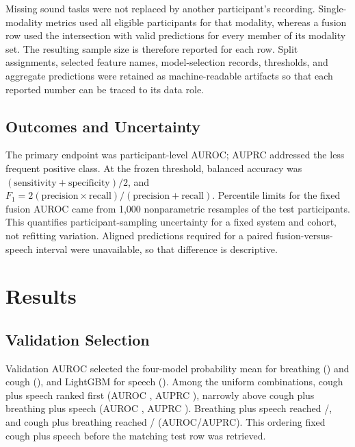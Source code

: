 \documentclass[conference]{IEEEtran}
\begin{document}
Missing sound tasks were not replaced by another participant's recording.
Single-modality metrics used all eligible participants for that modality,
whereas a fusion row used the intersection with valid predictions for every
member of its modality set. The resulting sample size is therefore reported for
each row. Split assignments, selected feature names, model-selection records,
thresholds, and aggregate predictions were retained as machine-readable
artifacts so that each reported number can be traced to its data role.

\subsection{Outcomes and Uncertainty}

The primary endpoint was participant-level AUROC; AUPRC addressed the less
frequent positive class. At the frozen threshold, balanced accuracy was
$(\mathrm{sensitivity}+\mathrm{specificity})/2$, and
$F_1=2(\mathrm{precision}\times\mathrm{recall})/
(\mathrm{precision}+\mathrm{recall})$. Percentile limits for the fixed fusion
AUROC came from 1,000 nonparametric resamples of the \FusionTestN{} test
participants. This quantifies participant-sampling uncertainty for a fixed
system and cohort, not refitting variation. Aligned predictions required for a
paired fusion-versus-speech interval were unavailable, so that difference is
descriptive.

\section{Results}

\subsection{Validation Selection}

Validation AUROC selected the four-model probability mean for breathing
(\BreathValidationAUROC{}) and cough (\CoughValidationAUROC{}), and LightGBM
for speech (\SpeechValidationAUROC{}). Among the uniform combinations,
cough plus speech ranked first (AUROC \FusionValidationAUROC{}, AUPRC
\FusionValidationAUPRC{}), narrowly above cough plus breathing plus speech
(AUROC \AllModalitiesValidationAUROC{}, AUPRC
\AllModalitiesValidationAUPRC{}). Breathing plus speech reached
\BreathSpeechValidationAUROC{}/\BreathSpeechValidationAUPRC{}, and cough plus
breathing reached \CoughBreathValidationAUROC{}/
\CoughBreathValidationAUPRC{} (AUROC/AUPRC). This ordering fixed cough plus
speech before the matching test row was retrieved.
\end{document}
